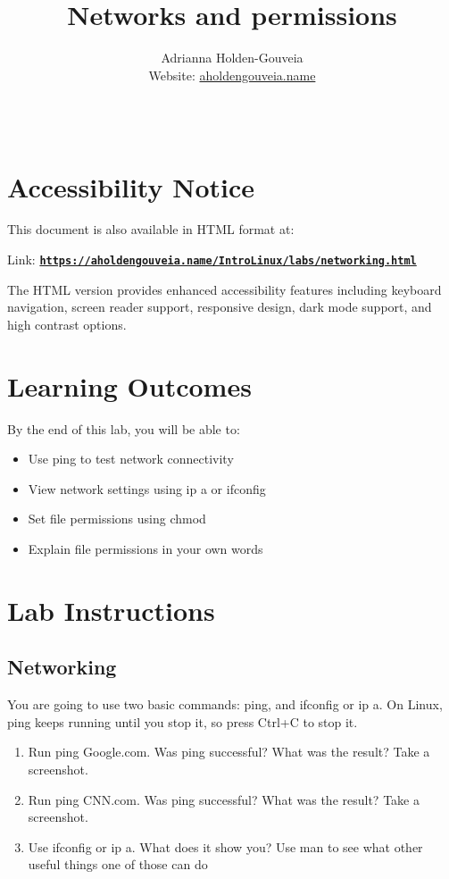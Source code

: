 \documentclass[12pt]{article}
\title{Networks and permissions}
\author{
        Adrianna Holden-Gouveia \\
        Website: \href{https://aholdengouveia.name}{aholdengouveia.name}\\ 
        \date{\vspace{-5ex}}
        \faGithub {: aholdengouveia} \\
        }
\begin{document}
    

\maketitle

\section*{Accessibility Notice}
This document is also available in HTML format at:

Link: \href{https://aholdengouveia.name/IntroLinux/labs/networking.html}{\textbf{\nolinkurl{https://aholdengouveia.name/IntroLinux/labs/networking.html}}}

The HTML version provides enhanced accessibility features including keyboard navigation, screen reader support, responsive design, dark mode support, and high contrast options.



\section*{Learning Outcomes}
By the end of this lab, you will be able to:
\begin{itemize}
    \item Use ping to test network connectivity
    \item View network settings using ip a or ifconfig
    \item Set file permissions using chmod
    \item Explain file permissions in your own words
\end{itemize}
\section*{Lab Instructions}


\subsection*{Networking}
You are going to use two basic commands: ping, and ifconfig or ip a. On Linux, ping keeps running until you stop it, so press Ctrl+C to stop it.

    \begin{enumerate}
        \item Run ping Google.com. Was ping successful? What was the result? Take a screenshot.
        \item Run ping CNN.com. Was ping successful? What was the result? Take a screenshot.
        \item Use ifconfig or ip a. What does it show you? Use man to see what other useful things one of those can do
    \end{enumerate}
\end{document}
